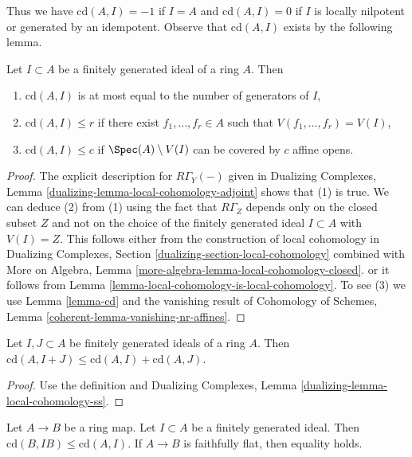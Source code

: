 \noindent
Thus we have $\text{cd}(A, I) = -1$ if
$I = A$ and $\text{cd}(A, I) = 0$ if $I$ is locally nilpotent
or generated by an idempotent.
Observe that $\text{cd}(A, I)$ exists by the following lemma.

\begin{lemma}
\label{lemma-bound-cd}
Let $I \subset A$ be a finitely generated ideal of a ring $A$.
Then
\begin{enumerate}
\item $\text{cd}(A, I)$ is at most equal to the number of
generators of $I$,
\item $\text{cd}(A, I) \leq r$ if there exist $f_1, \ldots, f_r \in A$
such that $V(f_1, \ldots, f_r) = V(I)$,
\item $\text{cd}(A, I) \leq c$ if $\Spec(A) \setminus V(I)$
can be covered by $c$ affine opens.
\end{enumerate}
\end{lemma}

\begin{proof}
The explicit description for $R\Gamma_Y(-)$ given in
Dualizing Complexes, Lemma \ref{dualizing-lemma-local-cohomology-adjoint}
shows that (1) is true. We can deduce (2) from (1) using the
fact that $R\Gamma_Z$ depends only on the closed subset
$Z$ and not on the choice of the finitely generated ideal
$I \subset A$ with $V(I) = Z$. This follows either from the
construction of local cohomology in
Dualizing Complexes, Section \ref{dualizing-section-local-cohomology}
combined with
More on Algebra, Lemma \ref{more-algebra-lemma-local-cohomology-closed}.
or it follows from Lemma \ref{lemma-local-cohomology-is-local-cohomology}.
To see (3) we use Lemma \ref{lemma-cd}
and the vanishing result of Cohomology of Schemes, Lemma
\ref{coherent-lemma-vanishing-nr-affines}.
\end{proof}

\begin{lemma}
\label{lemma-cd-sum}
Let $I, J \subset A$ be finitely generated ideals of a ring $A$.
Then $\text{cd}(A, I + J) \leq \text{cd}(A, I) + \text{cd}(A, J)$.
\end{lemma}

\begin{proof}
Use the definition and Dualizing Complexes, Lemma
\ref{dualizing-lemma-local-cohomology-ss}.
\end{proof}

\begin{lemma}
\label{lemma-cd-change-rings}
Let $A \to B$ be a ring map. Let $I \subset A$ be a finitely generated ideal.
Then $\text{cd}(B, IB) \leq \text{cd}(A, I)$. If $A \to B$ is faithfully
flat, then equality holds.
\end{lemma}

